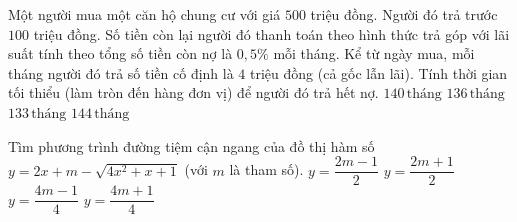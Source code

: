 \begin{ex}%
	Một người mua một căn hộ chung cư với giá $500$ triệu đồng. Người đó trả trước $100$ triệu đồng. Số tiền còn lại người đó thanh toán theo hình thức trả góp với lãi suất tính theo tổng số tiền còn nợ là $0{,}5\%$ mỗi tháng. Kể từ ngày mua, mỗi tháng người đó trả số tiền cố định là $4$ triệu đồng (cả gốc lẫn lãi). Tính thời gian tối thiểu (làm tròn đến hàng đơn vị) để người đó trả hết nợ.
	\choice
	{\True $140\, \text{tháng}$}
	{$136\, \text{tháng}$}
	{$133\, \text{tháng}$}
	{$144\, \text{tháng}$}
\end{ex}

\begin{ex}%
	Tìm phương trình đường tiệm cận ngang của đồ thị hàm số $y= 2x +m -\sqrt{4x^2 +x+1}$ (với $m$ là tham số).
	\choice
	{$y=\dfrac{2m-1}{2}$}
	{$y=\dfrac{2m+1}{2}$}
	{\True $y=\dfrac{4m-1}{4}$}
	{$y=\dfrac{4m+1}{4}$}
\end{ex}

